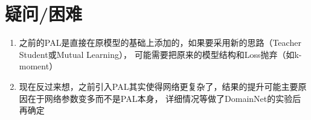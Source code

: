 \documentclass[UTF8]{ctexart}
\begin{document}
    \section{疑问/困难}
        \begin{enumerate}
            \item 之前的PAL是直接在原模型的基础上添加的，如果要采用新的思路（Teacher Student或Mutual Learning），
                可能需要把原来的模型结构和Loss抛弃（如k-moment）
            \item 现在反过来想，之前引入PAL其实使得网络更复杂了，结果的提升可能主要原因在于网络参数变多而不是PAL本身，
                详细情况等做了DomainNet的实验后再确定
        \end{enumerate}
\end{document}

